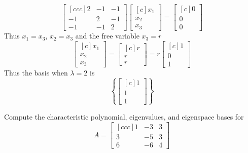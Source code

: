 \begin{solution}
$$\begin{bmatrix}[ccc]
2&-1&-1\\
-1&2&-1\\
-1&-1&2
\end{bmatrix}
\begin{bmatrix}[c]
x_1\\
x_2\\
x_3
\end{bmatrix}
=
\begin{bmatrix}[c]
0\\
0\\
0
\end{bmatrix}
$$
Thus $x_1 = x_3$, $x_2 = x_3$ and the free variable $x_3 = r$
$$
\begin{bmatrix}[c]
x_1\\
x_2\\
x_3
\end{bmatrix}
=
\begin{bmatrix}[c]
r\\
r\\
r
\end{bmatrix}
=
r
\begin{bmatrix}[c]
1\\
0\\
1
\end{bmatrix}
$$
Thus the basis when $\lambda = 2$ is
$$
\left\{
\begin{bmatrix}[c]
1\\
1\\
1
\end{bmatrix}
\right\}
$$
\end{solution}
\ii 
Compute the characteristic polynomial, eigenvalues, and eigenspace bases for
$$A=
\begin{bmatrix}[ccc]
1&-3&3\\
3&-5&3\\
6&-6&4
\end{bmatrix}
$$
